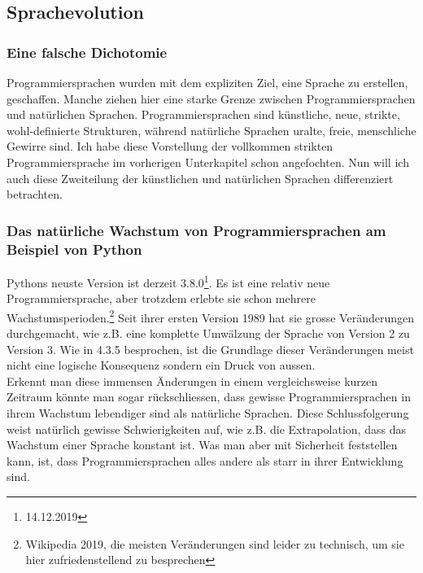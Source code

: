 \documentclass[10pt,a4paper]{article}
\begin{document}
\subsection{Sprachevolution}

\subsubsection{Eine falsche Dichotomie}
Programmiersprachen wurden mit dem expliziten Ziel, eine Sprache zu erstellen, geschaffen. Manche ziehen hier eine starke Grenze zwischen Programmiersprachen und natürlichen Sprachen. Programmiersprachen sind künstliche, neue, strikte, wohl-definierte Strukturen, während natürliche Sprachen uralte, freie, menschliche Gewirre sind.
Ich habe diese Vorstellung der vollkommen strikten Programmiersprache im vorherigen Unterkapitel schon angefochten. Nun will ich auch diese Zweiteilung der künstlichen und natürlichen Sprachen differenziert betrachten.

\subsubsection{Das natürliche Wachstum von Programmiersprachen am Beispiel von Python}
Pythons neuste Version ist derzeit 3.8.0\footnote{14.12.2019}. Es ist eine relativ neue Programmiersprache, aber trotzdem erlebte sie schon mehrere Wachstumsperioden.\footnote{Wikipedia 2019, die meisten Veränderungen sind leider zu technisch, um sie hier zufriedenstellend zu besprechen} Seit ihrer ersten Version 1989 hat sie grosse Veränderungen durchgemacht, wie z.B. eine komplette Umwälzung der Sprache von Version 2 zu Version 3. Wie in 4.3.5 besprochen, ist die Grundlage dieser Veränderungen meist nicht eine logische Konsequenz sondern ein Druck von aussen. \\
Erkennt man diese immensen Änderungen in einem vergleichsweise kurzen Zeitraum könnte man sogar rückschliessen, dass gewisse Programmiersprachen in ihrem Wachstum lebendiger sind als natürliche Sprachen. Diese Schlussfolgerung weist natürlich gewisse Schwierigkeiten auf, wie z.B. die Extrapolation, dass das Wachstum einer Sprache konstant ist. Was man aber mit Sicherheit feststellen kann, ist, dass Programmiersprachen alles andere als starr in ihrer Entwicklung sind.
\end{document}

